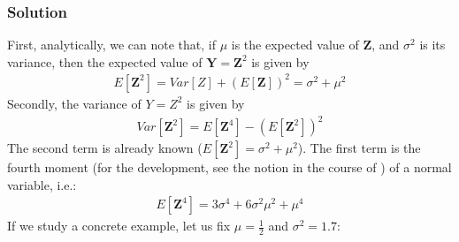 \documentclass[letterpaper,10pt,english]{jupyterBook}
\begin{document}
\subsubsection{Solution}
\label{\detokenize{01:id3}}
\sphinxAtStartPar
First, analytically, we can note that, if \(\mu\) is the expected value of \(\mathbf{Z}\), and  \(\sigma^2\) is its variance, then the expected value of \(\mathbf{Y}=\mathbf{Z}^2\) is given by
\begin{equation*}
\begin{split}
    E[\mathbf Z^2] = Var[Z] + (E[\mathbf Z])^2 = \sigma^2 + \mu^2
\end{split}
\end{equation*}
\sphinxAtStartPar
Secondly, the variance of \(Y=Z^2\) is given by
\begin{equation*}
\begin{split}
    Var[\mathbf Z^2] = E[\mathbf Z^4]-(E[\mathbf Z^2])^2
\end{split}
\end{equation*}
\sphinxAtStartPar
The second term is already known (\(E[\mathbf Z^2] = \sigma^2+\mu^2\)). The first term is the fourth moment (for the development, see the notion  in the course of ) of a normal variable, i.e.:
\begin{equation*}
\begin{split}
    E[\mathbf Z^4] = 3\sigma^4 + 6\sigma^2\mu^2 + \mu^4
\end{split}
\end{equation*}
\sphinxAtStartPar
If we study a concrete example, let us fix \(\mu=\frac12\) and \(\sigma^2=1.7\):
\end{document}
